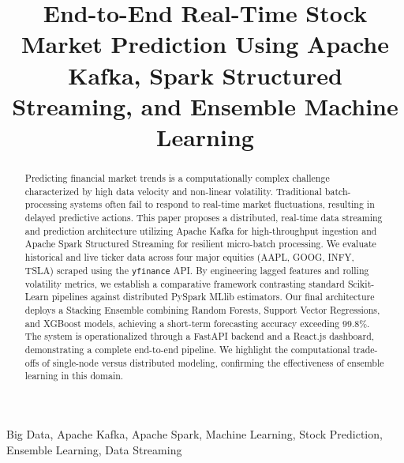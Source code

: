 \documentclass[conference]{IEEEtran}
\begin{document}
\title{End-to-End Real-Time Stock Market Prediction Using Apache Kafka, Spark Structured Streaming, and Ensemble Machine Learning}

\author{
\and
{}
}

\maketitle

\begin{abstract}
Predicting financial market trends is a computationally complex challenge characterized by high data velocity and non-linear volatility. Traditional batch-processing systems often fail to respond to real-time market fluctuations, resulting in delayed predictive actions. This paper proposes a distributed, real-time data streaming and prediction architecture utilizing Apache Kafka for high-throughput ingestion and Apache Spark Structured Streaming for resilient micro-batch processing. We evaluate historical and live ticker data across four major equities (AAPL, GOOG, INFY, TSLA) scraped using the \texttt{yfinance} API. By engineering lagged features and rolling volatility metrics, we establish a comparative framework contrasting standard Scikit-Learn pipelines against distributed PySpark MLlib estimators. Our final architecture deploys a Stacking Ensemble combining Random Forests, Support Vector Regressions, and XGBoost models, achieving a short-term forecasting accuracy exceeding 99.8\%. The system is operationalized through a FastAPI backend and a React.js dashboard, demonstrating a complete end-to-end pipeline. We highlight the computational trade-offs of single-node versus distributed modeling, confirming the effectiveness of ensemble learning in this domain.
\end{abstract}

\begin{IEEEkeywords}
Big Data, Apache Kafka, Apache Spark, Machine Learning, Stock Prediction, Ensemble Learning, Data Streaming
\end{IEEEkeywords}
\end{document}
